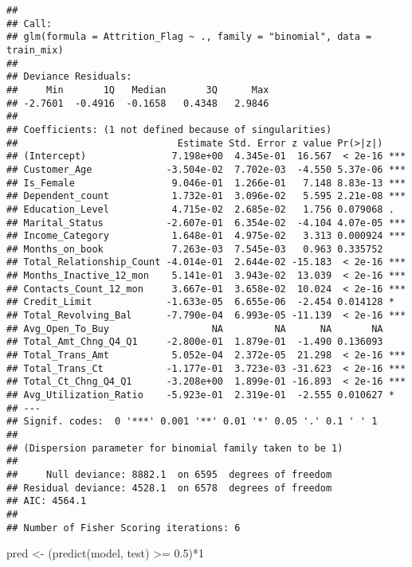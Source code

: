 \documentclass[
]{article}
\newenvironment{Shaded}{\begin{snugshade}}{\end{snugshade}}
\newcommand{\DecValTok}[1]{\textcolor[rgb]{0.00,0.00,0.81}{#1}}
\newcommand{\FloatTok}[1]{\textcolor[rgb]{0.00,0.00,0.81}{#1}}
\newcommand{\FunctionTok}[1]{\textcolor[rgb]{0.00,0.00,0.00}{#1}}
\newcommand{\NormalTok}[1]{#1}
\newcommand{\OtherTok}[1]{\textcolor[rgb]{0.56,0.35,0.01}{#1}}
\newcommand{\SpecialCharTok}[1]{\textcolor[rgb]{0.00,0.00,0.00}{#1}}
\begin{document}
\begin{verbatim}
## 
## Call:
## glm(formula = Attrition_Flag ~ ., family = "binomial", data = train_mix)
## 
## Deviance Residuals: 
##     Min       1Q   Median       3Q      Max  
## -2.7601  -0.4916  -0.1658   0.4348   2.9846  
## 
## Coefficients: (1 not defined because of singularities)
##                            Estimate Std. Error z value Pr(>|z|)    
## (Intercept)               7.198e+00  4.345e-01  16.567  < 2e-16 ***
## Customer_Age             -3.504e-02  7.702e-03  -4.550 5.37e-06 ***
## Is_Female                 9.046e-01  1.266e-01   7.148 8.83e-13 ***
## Dependent_count           1.732e-01  3.096e-02   5.595 2.21e-08 ***
## Education_Level           4.715e-02  2.685e-02   1.756 0.079068 .  
## Marital_Status           -2.607e-01  6.354e-02  -4.104 4.07e-05 ***
## Income_Category           1.648e-01  4.975e-02   3.313 0.000924 ***
## Months_on_book            7.263e-03  7.545e-03   0.963 0.335752    
## Total_Relationship_Count -4.014e-01  2.644e-02 -15.183  < 2e-16 ***
## Months_Inactive_12_mon    5.141e-01  3.943e-02  13.039  < 2e-16 ***
## Contacts_Count_12_mon     3.667e-01  3.658e-02  10.024  < 2e-16 ***
## Credit_Limit             -1.633e-05  6.655e-06  -2.454 0.014128 *  
## Total_Revolving_Bal      -7.790e-04  6.993e-05 -11.139  < 2e-16 ***
## Avg_Open_To_Buy                  NA         NA      NA       NA    
## Total_Amt_Chng_Q4_Q1     -2.800e-01  1.879e-01  -1.490 0.136093    
## Total_Trans_Amt           5.052e-04  2.372e-05  21.298  < 2e-16 ***
## Total_Trans_Ct           -1.177e-01  3.723e-03 -31.623  < 2e-16 ***
## Total_Ct_Chng_Q4_Q1      -3.208e+00  1.899e-01 -16.893  < 2e-16 ***
## Avg_Utilization_Ratio    -5.923e-01  2.319e-01  -2.555 0.010627 *  
## ---
## Signif. codes:  0 '***' 0.001 '**' 0.01 '*' 0.05 '.' 0.1 ' ' 1
## 
## (Dispersion parameter for binomial family taken to be 1)
## 
##     Null deviance: 8882.1  on 6595  degrees of freedom
## Residual deviance: 4528.1  on 6578  degrees of freedom
## AIC: 4564.1
## 
## Number of Fisher Scoring iterations: 6
\end{verbatim}

\begin{Shaded}
\begin{Highlighting}[]
\NormalTok{pred }\OtherTok{\textless{}{-}}\NormalTok{ (}\FunctionTok{predict}\NormalTok{(model, test) }\SpecialCharTok{\textgreater{}=} \FloatTok{0.5}\NormalTok{)}\SpecialCharTok{*}\DecValTok{1}
\end{Highlighting}
\end{Shaded}
\end{document}
